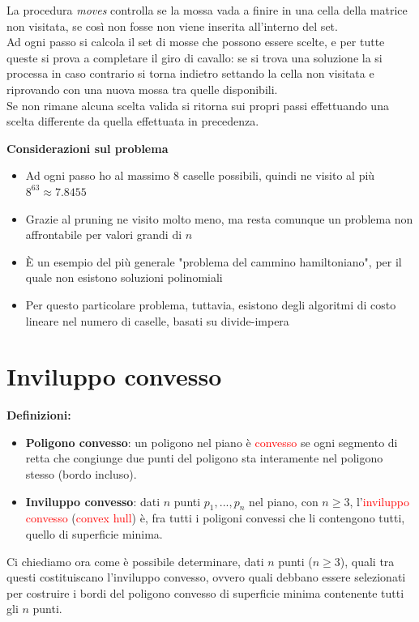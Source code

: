 \documentclass[../cheatSheetAlgoritmi.tex]{subfiles}
\begin{document}
La procedura \emph{moves} controlla se la mossa vada a finire in una cella della matrice non visitata, se così non fosse non viene inserita all'interno del set. \\
Ad ogni passo si calcola il set di mosse che possono essere scelte, e per tutte queste si prova a completare il giro di cavallo: se si trova una soluzione la si processa in caso contrario si torna indietro settando la cella non visitata e riprovando con una nuova mossa tra quelle disponibili. \\
Se non rimane alcuna scelta valida si ritorna sui propri passi effettuando una scelta differente da quella effettuata in precedenza.

\bigskip
\textbf{Considerazioni sul problema}
\begin{itemize}
	\item Ad ogni passo ho al massimo $8$ caselle possibili, quindi ne visito al più $8^{63} \approx 7.8455$
	\item Grazie al pruning ne visito molto meno, ma resta comunque un problema non affrontabile per valori grandi di $n$
	\item È un esempio del più generale "problema del cammino hamiltoniano", per il quale non esistono soluzioni polinomiali
	\item Per questo particolare problema, tuttavia, esistono degli algoritmi di costo lineare nel numero di caselle, basati su divide-impera
\end{itemize}

\section{Inviluppo convesso}
\textbf{Definizioni:}
\begin{itemize}
	\item \textbf{Poligono convesso}: un poligono nel piano è \textcolor{red}{convesso} se ogni segmento di retta che congiunge due punti del poligono sta interamente nel poligono stesso (bordo incluso).
	\item \textbf{Inviluppo convesso}: dati $n$ punti $p_1, . . . , p_n$ nel piano, con $n \geq 3$, l'\textcolor{red}{inviluppo convesso} (\textcolor{red}{convex hull}) è, fra tutti i poligoni convessi che li contengono tutti, quello di superficie minima.
\end{itemize}
Ci chiediamo ora come è possibile determinare, dati $n$ punti ($n \geq 3$), quali tra questi costituiscano l'inviluppo convesso, ovvero quali debbano essere selezionati per costruire i bordi del poligono convesso di superficie minima contenente tutti gli $n$ punti.
\end{document}
